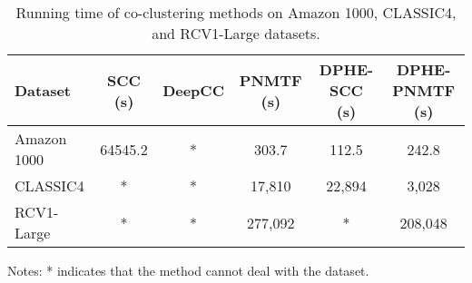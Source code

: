 
\begin{table*}[htbp]
    \centering
    \caption{Running time of co-clustering methods on Amazon 1000, CLASSIC4, and RCV1-Large datasets.}
    \label{tab:running-time}
    \begin{tabular}{@{} l ccccc @{}}
        \toprule
        Dataset     & SCC (s) & DeepCC & PNMTF (s) & DPHE-SCC (s) & DPHE-PNMTF (s) \\
        \midrule
        Amazon 1000 & 64545.2 & *      & 303.7     & 112.5     & 242.8       \\
        CLASSIC4    & *       & *      & 17,810    & 22,894    & 3,028       \\
        RCV1-Large  & *       & *      & 277,092   & *         & 208,048     \\
        \bottomrule
    \end{tabular}
    \begin{tablenotes}
        \small
        \item Notes: * indicates that the method cannot deal with the dataset.
    \end{tablenotes}
\end{table*}

